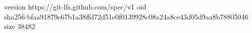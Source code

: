 version https://git-lfs.github.com/spec/v1
oid sha256:bfaa91879e67b1a38ffd72d51e0f0139928c08a24a8ce43d05d9aa8b78805046
size 38482
